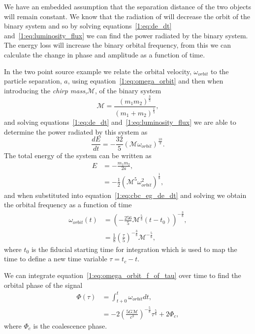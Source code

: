 We have an embedded assumption that the separation distance of the two objects will remain constant. We know that the radiation of \gws will decrease the orbit of the binary system and so by solving equations~\ref{1:eq:de_dt} and~\ref{1:eq:luminosity_flux} we can find the power radiated by the binary system. The energy loss will increase the binary orbital frequency, from this we can calculate the change in phase and amplitude as a function of time.

In the two point source example we relate the orbital velocity, $\omega_{orbit}$ to the particle separation, $a$, using equation~\ref{1:eq:omega_orbit} and then when introducing the \textit{chirp mass},$\mathcal{M}$, of the binary system
%
\begin{equation}
    \mathcal{M} = \frac{(m_{1}m_{2})^{\frac{3}{5}}}{(m_{1} + m_{2})^\frac{1}{5}},
\end{equation}
%
and solving equations~\ref{1:eq:de_dt} and~\ref{1:eq:luminosity_flux} we are able to determine the power radiated by this system as
%
\begin{equation}
    \frac{dE}{dt} = -\frac{32}{5}(\mathcal{M}\omega_{orbit})^\frac{10}{3}.
    \label{1:eq:cbc_eg_de_dt}
\end{equation}
%
The total energy of the system can be written as
%
\begin{align}
    E &= -\frac{m_{1}m_{2}}{2a}, \\
      &=-\frac{1}{2}(\mathcal{M}^{5} \omega^{2}_{orbit})^\frac{1}{8},
      \label{1:eq:total_energy_cbc}
\end{align}
%
and when substituted into equation~\ref{1:eq:cbc_eg_de_dt} and solving we obtain the orbital frequency as a function of time
%
\begin{align}
    \omega_{orbit}(t) &= \left(-\frac{256}{5}\mathcal{M}^{\frac{5}{3}}(t - t_{0})\right)^{-\frac{3}{8}}, \\
                      &= \frac{1}{8}\left(\frac{\tau}{5}\right)^{-\frac{3}{8}}\mathcal{M}^{-\frac{5}{8}},
    \label{1:eq:omega_orbit_f_of_tau}
\end{align}
%
where $t_{0}$ is the fiducial starting time for integration which is used to map the time to define a new time variable $\tau = t_{c} - t$.


We can integrate equation~\ref{1:eq:omega_orbit_f_of_tau} over time to find the orbital phase of the \gwadj signal
%
\begin{align}
    \Phi(\tau) &= \int^{t}_{t+{0}} \omega_{orbit} dt, \\ 
    &= -2\left(\frac{5G\mathcal{M}}{c^{3}}\right)^{-\frac{5}{8}} \tau^{\frac{5}{8}} + 2\Phi_{c},
\end{align}
%
where $\Phi_{c}$ is the coalescence phase.

